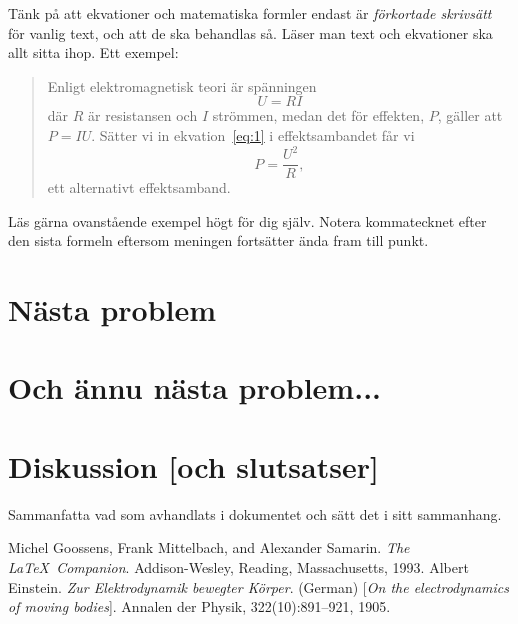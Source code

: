 \documentclass[a4paper,12pt]{article}
\begin{document}
Tänk på att ekvationer och matematiska formler endast är
\emph{förkortade skrivsätt} för vanlig text, och att de ska behandlas 
så. Läser man text och ekvationer ska allt sitta ihop. Ett exempel: 
%
%
%
%
%
%
\begin{quote}
  Enligt elektromagnetisk teori är spänningen
%
  \begin{equation} %
    \label{eq:1}   %
    U = RI         %
  \end{equation}   %
%
  där $R$ är resistansen och $I$ strömmen, medan det för effekten,
  $P$, gäller att $P = IU$. Sätter vi in ekvation~\ref{eq:1} i 
  effektsambandet får vi
%
  \begin{displaymath}
    P=\frac{U^2}{R},
  \end{displaymath}
%
  ett alternativt effektsamband.
\end{quote}


Läs gärna ovanstående exempel högt för dig själv. Notera kommatecknet
efter den sista formeln eftersom meningen fortsätter ända fram till
punkt. 


\section{Nästa problem}
\label{sec:uppg2}


\section{Och ännu nästa problem...}
\label{sec:uppgN}


\section{Diskussion [och slutsatser]}
\label{sec:disk}


Sammanfatta vad som avhandlats i dokumentet och sätt det i
sitt sammanhang.
%
\begin{thebibliography}{99}
%
Michel Goossens, Frank Mittelbach, and Alexander Samarin. 
\textit{The \LaTeX\ Companion}. 
Addison-Wesley, Reading, Massachusetts, 1993.
%
Albert Einstein. 
\textit{Zur Elektrodynamik bewegter K{\"o}rper}. (German) 
[\textit{On the electrodynamics of moving bodies}]. 
Annalen der Physik, 322(10):891–921, 1905.
%
\end{thebibliography}
%
\end{document}
